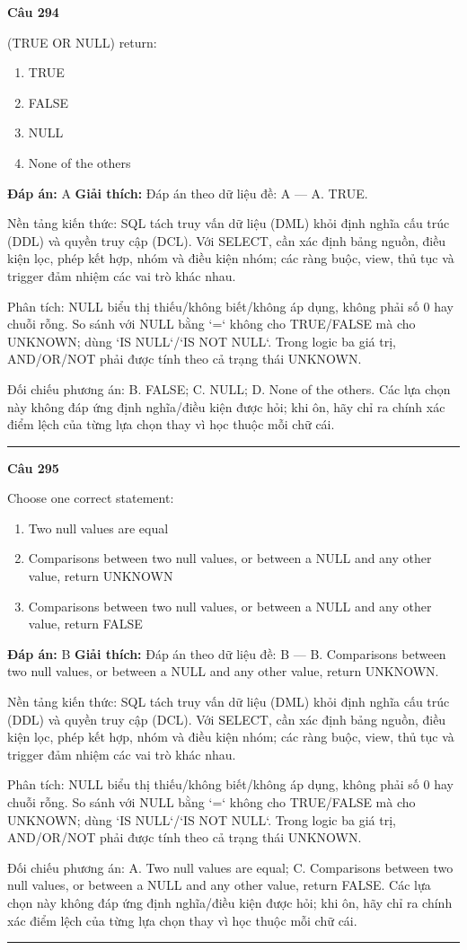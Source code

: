\documentclass[11pt,a4paper]{article}
\newenvironment{question}[1]{%
  \par\vspace{1em}\noindent\textbf{\large Câu #1}\par\vspace{0.4em}
}{%
  \par\vspace{1em}\hrule\vspace{0.6em}
}
\newenvironment{choices}{%
  \begin{enumerate}[label=\textbf{\Alph*.},leftmargin=2.2em,itemsep=2pt,topsep=3pt]
}{%
  \end{enumerate}
}
\newcommand{\choice}{\item}
\begin{document}
\begin{question}{294}
(TRUE OR NULL) return:
\begin{choices}
\choice TRUE
\choice FALSE
\choice NULL
\choice None of the others
\end{choices}
\textbf{Đáp án:} A
\textbf{Giải thích:} Đáp án theo dữ liệu đề: A — A. TRUE.

Nền tảng kiến thức: SQL tách truy vấn dữ liệu (DML) khỏi định nghĩa cấu trúc (DDL) và quyền truy cập (DCL). Với SELECT, cần xác định bảng nguồn, điều kiện lọc, phép kết hợp, nhóm và điều kiện nhóm; các ràng buộc, view, thủ tục và trigger đảm nhiệm các vai trò khác nhau.

Phân tích: NULL biểu thị thiếu/không biết/không áp dụng, không phải số 0 hay chuỗi rỗng. So sánh với NULL bằng `=` không cho TRUE/FALSE mà cho UNKNOWN; dùng `IS NULL`/`IS NOT NULL`. Trong logic ba giá trị, AND/OR/NOT phải được tính theo cả trạng thái UNKNOWN.

Đối chiếu phương án: B. FALSE; C. NULL; D. None of the others. Các lựa chọn này không đáp ứng định nghĩa/điều kiện được hỏi; khi ôn, hãy chỉ ra chính xác điểm lệch của từng lựa chọn thay vì học thuộc mỗi chữ cái.
\end{question}

\begin{question}{295}
Choose one correct statement:
\begin{choices}
\choice Two null values are equal
\choice Comparisons between two null values, or between a NULL and any other value, return UNKNOWN
\choice Comparisons between two null values, or between a NULL and any other value, return FALSE
\end{choices}
\textbf{Đáp án:} B
\textbf{Giải thích:} Đáp án theo dữ liệu đề: B — B. Comparisons between two null values, or between a NULL and any other value, return UNKNOWN.

Nền tảng kiến thức: SQL tách truy vấn dữ liệu (DML) khỏi định nghĩa cấu trúc (DDL) và quyền truy cập (DCL). Với SELECT, cần xác định bảng nguồn, điều kiện lọc, phép kết hợp, nhóm và điều kiện nhóm; các ràng buộc, view, thủ tục và trigger đảm nhiệm các vai trò khác nhau.

Phân tích: NULL biểu thị thiếu/không biết/không áp dụng, không phải số 0 hay chuỗi rỗng. So sánh với NULL bằng `=` không cho TRUE/FALSE mà cho UNKNOWN; dùng `IS NULL`/`IS NOT NULL`. Trong logic ba giá trị, AND/OR/NOT phải được tính theo cả trạng thái UNKNOWN.

Đối chiếu phương án: A. Two null values are equal; C. Comparisons between two null values, or between a NULL and any other value, return FALSE. Các lựa chọn này không đáp ứng định nghĩa/điều kiện được hỏi; khi ôn, hãy chỉ ra chính xác điểm lệch của từng lựa chọn thay vì học thuộc mỗi chữ cái.
\end{question}
\end{document}

